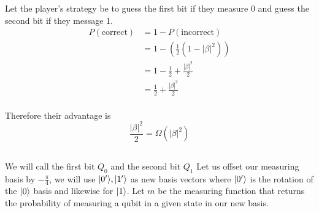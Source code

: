 Let the player's strategy be to guess the first bit if they measure 0 and guess the second bit if they message 1.
\begin{align*}
    P(\text{correct}) &= 1-P(\text{incorrect})\\
        &= 1-(\frac{1}{2}(1-|\beta|^2))\\
        &= 1-\frac{1}{2} + \frac{|\beta|^2}{2}\\
        &= \frac{1}{2} + \frac{|\beta|^2}{2}\\
\end{align*}

Therefore their advantage is 
\[\frac{|\beta|^2}{2} = \Omega(|\beta|^2)\]


\subsection{}
We will call the first bit $Q_0$ and the second bit $Q_1$
Let us offset our measuring basis by $-\frac{\pi}{4}$, we will use $\lvert0'\rangle,\lvert1'\rangle$ as new basis vectors where $\lvert0'\rangle$ is the rotation of the $\lvert0\rangle$ basis and likewise for $\lvert1\rangle$.
Let $m$ be the measuring function that returns the probability of measuring a qubit in a given state in our new basis.

